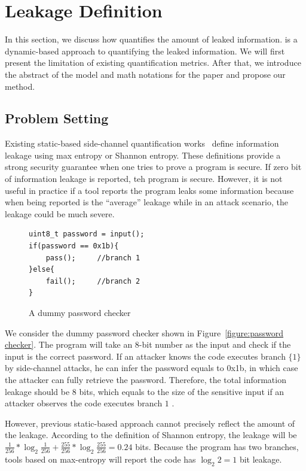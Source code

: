 \section{\tool{} Leakage Definition}
\label{sec:trace-qif}
In this section, we discuss how \tool{} quantifies the amount of leaked
information. \tool{} is a dynamic-based approach to quantifying the leaked
information. We will first present the limitation of existing quantification
metrics. After that, we introduce the abstract of the model and math notations
for the paper and propose our method.

\subsection{Problem Setting}
Existing static-based side-channel quantification
works~\cite{182946,Wichelmann:2018:MFF:3274694.3274741 } define information
leakage using max entropy or Shannon entropy. These definitions provide a strong
security guarantee when one tries to prove a program is secure.  If zero bit of
information leakage is reported, teh program is secure. However, it is not
useful in practice if a tool reports the program leaks some information because
when being reported is the ``average'' leakage while in an attack scenario, the
leakage could be much severe.


\begin{figure}[h!]
    \centering
    \begin{lstlisting}[xleftmargin=.03\textwidth,xrightmargin=.01\textwidth]
uint8_t password = input();
if(password == 0x1b){
    pass();     //branch 1
}else{
    fail();     //branch 2
}
\end{lstlisting}
    \caption{A dummy password checker}
    \label{figure:password checker}
\end{figure}

We consider the dummy password checker shown in Figure~\ref{figure:password
checker}. The program will take an 8-bit number as the input and check if the
input is the correct password. If an attacker knows the code executes branch
$\{{1\}}$ by side-channel attacks, he can infer the password equals to 0x1b, in
which case the attacker can fully retrieve the password. Therefore, the total
information leakage should be 8 bits, which equals to the size of the sensitive
input if an attacker observes the code executes branch $1$ .

However, previous static-based approach cannot precisely reflect the amount of
the leakage. According to the definition of Shannon entropy, the leakage will be
$\frac{1}{256}*\log_{2}\frac{1}{256} + \frac{255}{256} *\log_{2}\frac{255}{256}=
0.24$ bits. Because the program has two branches, tools based on max-entropy
will report the code has $\log_2{2} = 1$ bit leakage.

